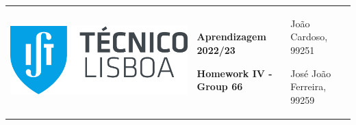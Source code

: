 \documentclass[11pt,a4paper]{article}
\begin{document}
\begin{center}
  \textbf{}
\end{center}

\hspace{-8.25mm}
\begin{tabularx}{1.09\textwidth}{X}
  
\end{tabularx}

\pagebreak
\hspace{-8.25mm}
\color{darkgray}
\renewcommand\tabularxcolumn[1]{m{#1}}
\begin{tabularx}{1.09\textwidth} {>{\raggedright\arraybackslash}X >{\centering\arraybackslash}X >{\raggedleft\arraybackslash}X}
  \includegraphics[scale=0.2]{tecnico.pdf}                           &
  \textbf{Aprendizagem 2022/23} \par \textbf{Homework IV - Group 66} &
  João Cardoso, 99251 \par José João Ferreira, 99259
\end{tabularx}
\renewcommand\tabularxcolumn[1]{p{#1}}
\color{black}

\begin{center}
  \textbf{}
\end{center}

\hspace{-8.25mm}
\begin{tabularx}{1.09\textwidth}{X}
  
\end{tabularx}
\end{document}
